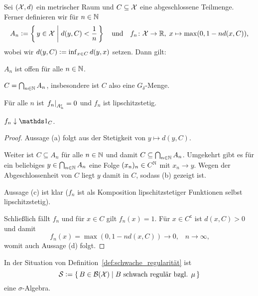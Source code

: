 \documentclass[../main/main.tex]{subfiles}
\begin{document}
	\begin{Hilfssatz}
		\label{hilfssatz:offene_mengen}
		Sei $(\mathcal{X}, d)$ ein metrischer Raum und $C \subseteq \mathcal{X}$ eine abgeschlossene 
		Teilmenge. Ferner definieren wir für $n \in \mathbb{N}$
		$$ A_n \vcentcolon = \left\{\, y \in \mathcal{X} \; \middle| \; d(y, C) < \frac{1}{n} \,\right\} \quad \text{und} \quad 
		f_n \colon \mathcal{X} \to \mathbb{R}, \; x \mapsto \max (0, 1-n d(x, C))  \text{,}$$
		wobei wir $d(y, C) \vcentcolon = \inf_{x \in C} d(y, x)$ setzen.
		Dann gilt:
		\begin{enumeratethm}
			\item $A_n$ ist offen für alle $n \in \mathbb{N}$.
			\item $C = \bigcap_{n \in \mathbb{N}} A_n$, insbesondere ist $C$ also eine $G_\delta$-Menge.
			\item Für alle $n$ ist $\left.f_n\right|_{A_n^\mathsf{c}} = 0$ und $f_n$ ist lipschitzstetig.
			\item $f_n \convdown \indfct_C$.
		\end{enumeratethm}
	\end{Hilfssatz}
	
	\begin{proof}
		Aussage (a) folgt aus der Stetigkeit von $y \mapsto d(y, C)$.
		
		Weiter ist $C \subseteq A_n$ für alle $n \in \mathbb{N}$ und damit 
		$C \subseteq \bigcap_{n \in \mathbb{N}} A_n$. 
		Umgekehrt gibt es für ein beliebiges $y \in \bigcap_{n \in \mathbb{N}} A_n$
		eine Folge $(x_n)_n \in C^{\mathbb{N}}$ mit $x_n \rightarrow y$. 
		Wegen der Abgeschlossenheit von $C$ liegt $y$ damit in $C$, sodass (b) gezeigt ist.
		
		Aussage (c) ist klar ($f_n$ ist als Komposition 
		lipschitzstetiger Funktionen selbst lipschitzstetig).
		
		Schließlich fällt $f_n$ und für $x \in C$ gilt $f_n(x) = 1$. 
		Für $x \in C^\mathsf{c}$ ist $d(x, C) > 0$ und damit
		$$f_n(x) = \max (0, 1-n d(x, C))
		\to 0 \text{,} \quad n \to \infty \text{,}$$
		womit auch Aussage (d) folgt.
	\end{proof}
	
	\begin{Hilfssatz}
		\label{hilfssatz:schwach_reguläre_mengen_sigma_algebra}
		In der Situation von Definition~\ref{def:schwache_regularität} ist
		$$\mathcal{S} \vcentcolon = \left\{\, B \in \mathcal{B}(\mathcal{X}) \; \middle| \; B \text{ schwach regulär bzgl. } \mu \,\right\}$$
		eine $\sigma$-Algebra.
	\end{Hilfssatz}
	
\end{document}
